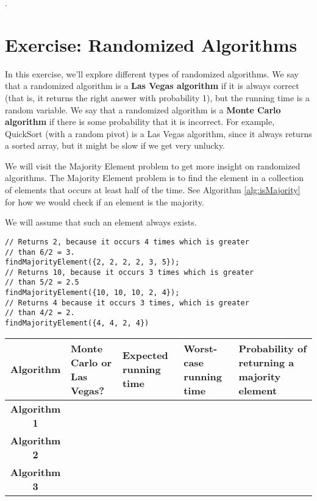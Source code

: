 \documentclass [12pt]{article}
\begin{document}
.

\pagebreak
\section {Exercise: Randomized Algorithms } 
\label{sec:last}

In this exercise, we'll explore different types of randomized algorithms. We say that a randomized algorithm is a \textbf {Las Vegas algorithm} if it is always correct (that is, it returns the right answer with probability 1), but the running time is a random variable. We say that a randomized algorithm is a \textbf {Monte Carlo algorithm} if there is some probability that it is incorrect. For example, QuickSort (with a random pivot) is a Las Vegas algorithm, since it always returns a sorted array, but it might be slow if we get very unlucky. 

We will visit the Majority Element problem to get more insight on randomized algorithms. The Majority Element problem is to find the element in a collection of elements that occurs at least half of the time. See Algorithm \ref{alg:isMajority} for how we would check if an element is the majority.

We will assume that such an element always exists.

\vspace{2em}
\begin{verbatim}
// Returns 2, because it occurs 4 times which is greater
// than 6/2 = 3.
findMajorityElement({2, 2, 2, 2, 3, 5});
// Returns 10, because it occurs 3 times which is greater
// than 5/2 = 2.5
findMajorityElement({10, 10, 10, 2, 4});
// Returns 4 because it occurs 3 times, which is greater
// than 4/2 = 2.
findMajorityElement({4, 4, 2, 4})
\end{verbatim}

\vspace{2em}
\begin{center} 
\begin{tabular}{|c|p{3cm}|p{2cm}|p{2cm}|p{4cm}|}
\hline 
Algorithm & Monte Carlo or Las Vegas? & Expected running time & Worst-case running time & Probability of returning a majority element \\
\hline 
\textbf {Algorithm 1} & & & & \\ 
\hline 
\textbf {Algorithm 2} & & & & \\
\hline 
\textbf {Algorithm 3} & & & & \\ 
\hline 
\end{tabular}
\end{center}
\end{document}
